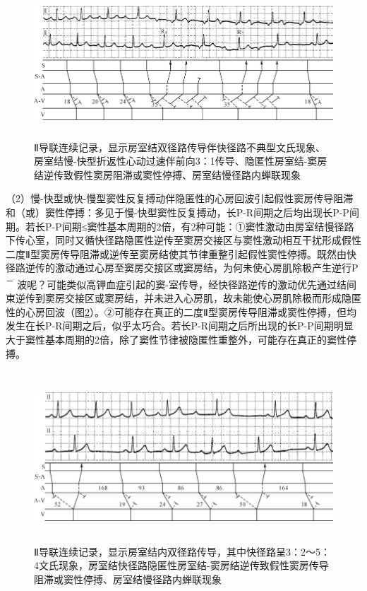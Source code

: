 \begin{figure}[!htbp]
 \centering
 \includegraphics[width=5.75in,height=2.1875in]{./images/Image00564.jpg}
 \captionsetup{justification=centering}
 \caption{Ⅱ导联连续记录，显示房室结双径路传导伴快径路不典型文氏现象、房室结慢-快型折返性心动过速伴前向3：1传导、隐匿性房室结-窦房结逆传致假性窦房阻滞或窦性停搏、房室结慢径路内蝉联现象}
 \label{fig35-11}
  \end{figure} 

（2）慢-快型或快-慢型窦性反复搏动伴隐匿性的心房回波引起假性窦房传导阻滞和（或）窦性停搏：多见于慢-快型窦性反复搏动，长P-R间期之后均出现长P-P间期。若长P-P间期≤窦性基本周期的2倍，有2种可能：①窦性激动由房室结慢径路下传心室，同时又循快径路隐匿性逆传至窦房交接区与窦性激动相互干扰形成假性二度Ⅱ型窦房传导阻滞或逆传至窦房结使其节律重整引起假性窦性停搏。既然由快径路逆传的激动通过心房至窦房交接区或窦房结，为何未使心房肌除极产生逆行P\textsuperscript{－}
波呢？可能类似高钾血症引起的窦-室传导，经快径路逆传的激动优先通过结间束逆传到窦房交接区或窦房结，并未进入心房肌，故未能使心房肌除极而形成隐匿性的心房回波（图\ref{fig35-12}）。②可能存在真正的二度Ⅱ型窦房传导阻滞或窦性停搏，但均发生在长P-R间期之后，似乎太巧合。若长P-R间期之后所出现的长P-P间期明显大于窦性基本周期的2倍，除了窦性节律被隐匿性重整外，可能存在真正的窦性停搏。

\begin{figure}[!htbp]
 \centering
 \includegraphics[width=5.80208in,height=2.52083in]{./images/Image00565.jpg}
 \captionsetup{justification=centering}
 \caption{Ⅱ导联连续记录，显示房室结内双径路传导，其中快径路呈3：2～5：4文氏现象，房室结快径路隐匿性房室结-窦房结逆传致假性窦房传导阻滞或窦性停搏、房室结慢径路内蝉联现象}
 \label{fig35-12}
  \end{figure} 


